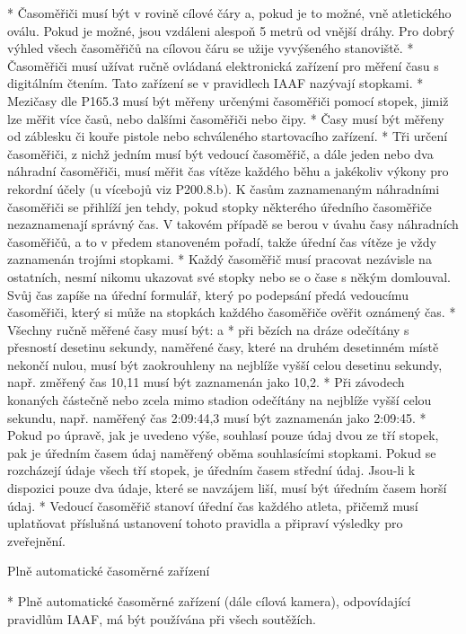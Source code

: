 * Časoměřiči musí být v rovině cílové čáry a, pokud je to možné, vně atletického oválu. Pokud je možné, jsou vzdáleni alespoň 5 metrů od vnější dráhy. Pro dobrý výhled všech časoměřičů na cílovou čáru se užije vyvýšeného stanoviště.
* Časoměřiči musí užívat ručně ovládaná elektronická zařízení pro měření času s digitálním čtením. Tato zařízení se v pravidlech IAAF nazývají stopkami.
* Mezičasy dle P165.3 musí být měřeny určenými časoměřiči pomocí stopek, jimiž lze měřit více časů, nebo dalšími časoměřiči nebo čipy.
* Časy musí být měřeny od záblesku či kouře pistole nebo schváleného startovacího zařízení.
* Tři určení časoměřiči, z nichž jedním musí být vedoucí časoměřič, a dále jeden nebo dva náhradní časoměřiči, musí měřit čas vítěze každého běhu a jakékoliv výkony pro rekordní účely (u vícebojů viz P200.8.b). K časům zaznamenaným náhradními časoměřiči se přihlíží jen tehdy, pokud stopky některého úředního časoměřiče nezaznamenají správný čas. V takovém případě se berou v úvahu časy náhradních časoměřičů, a to v předem stanoveném pořadí, takže úřední čas vítěze je vždy zaznamenán trojími stopkami.
* Každý časoměřič musí pracovat nezávisle na ostatních, nesmí nikomu ukazovat své stopky nebo se o čase s někým domlouval. Svůj čas zapíše na úřední formulář, který po podepsání předá vedoucímu časoměřiči, který si může na stopkách každého časoměřiče ověřit oznámený čas.
* Všechny ručně měřené časy musí být:
  \begitems \style a
  * při bězích na dráze odečítány s přesností desetinu sekundy, naměřené časy, které na druhém desetinném místě nekončí nulou, musí být zaokrouhleny na nejblíže vyšší celou desetinu sekundy, např. změřený čas 10,11 musí být zaznamenán jako 10,2.
  * Při závodech konaných částečně nebo zcela mimo stadion odečítány na nejblíže vyšší celou sekundu, např. naměřený čas 2:09:44,3 musí být zaznamenán jako 2:09:45.
  \enditems
* Pokud po úpravě, jak je uvedeno výše, souhlasí pouze údaj dvou ze tří stopek, pak je úředním časem údaj naměřený oběma souhlasícími stopkami. Pokud se rozcházejí údaje všech tří stopek, je úředním časem střední údaj. Jsou-li k dispozici pouze dva údaje, které se navzájem liší, musí být úředním časem horší údaj.
* Vedoucí časoměřič stanoví úřední čas každého atleta, přičemž musí uplatňovat příslušná ustanovení tohoto pravidla a připraví výsledky pro zveřejnění.

Plně automatické časoměrné zařízení

* Plně automatické časoměrné zařízení (dále cílová kamera), odpovídající pravidlům IAAF, má být používána při všech soutěžích.

